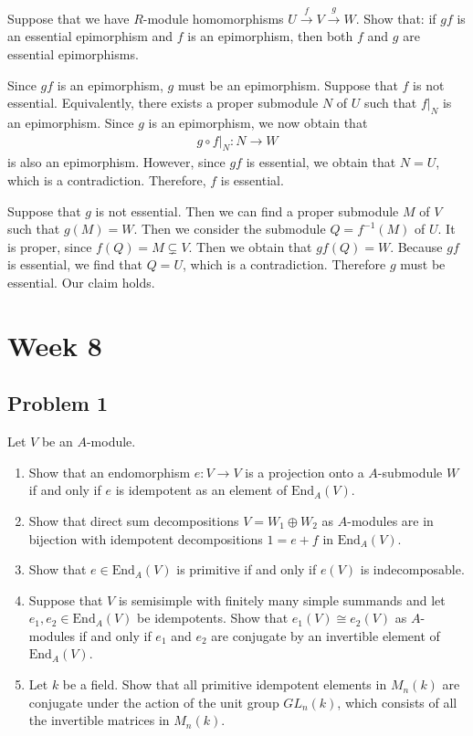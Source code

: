 Suppose that we have $R$-module homomorphisms $U \xrightarrow{f} V \xrightarrow{g} W$. Show that: if $gf$ is an essential epimorphism and $f$ is an epimorphism, then both $f$ and $g$ are essential epimorphisms.
\begin{solution}
    Since $gf$ is an epimorphism, $g$ must be an epimorphism. Suppose that $f$ is not essential. Equivalently, there exists a proper submodule $N$ of $U$ such that $f|_{N}$ is an epimorphism. Since $g$ is an epimorphism, we now obtain that 
    \begin{align*}
        g \circ f|_N: N\to W 
    \end{align*}  
    is also an epimorphism. However, since $gf$ is essential, we obtain that $N=U$, which is a contradiction.
    Therefore, $f$ is essential. 

    Suppose that $g$ is not essential. Then we can find a proper submodule $M$ of $V$ such that $g(M)=W$.
    Then we consider the submodule $Q = f^{-1}(M)$ of $U$. It is proper, since $f(Q)=M\subsetneq V$. 
    Then we obtain that $gf(Q)=W$. Because $gf$ is essential, we find that $Q=U$, which is a contradiction. Therefore $g$ must be essential.
    Our claim holds.
\end{solution}

\section{Week 8}
\subsection*{Problem 1}
Let $V$ be an $A$-module.
\begin{enumerate}
    \item[(a)] Show that an endomorphism $e : V \to V$ is a projection onto a $A$-submodule $W$ if and only if $e$ is idempotent as an element of $\text{End}_A(V)$.
    \item[(b)] Show that direct sum decompositions $V = W_1 \oplus W_2$ as $A$-modules are in bijection with idempotent decompositions $1 = e + f$ in $\text{End}_A(V)$.
    \item[(c)] Show that $e \in \text{End}_A(V)$ is primitive if and only if $e(V)$ is indecomposable.
    \item[(d)] Suppose that $V$ is semisimple with finitely many simple summands and let $e_1, e_2 \in \text{End}_A(V)$ be idempotents. Show that $e_1(V) \cong e_2(V)$ as $A$-modules if and only if $e_1$ and $e_2$ are conjugate by an invertible element of $\text{End}_A(V)$.
    \item[(e)] Let $k$ be a field. Show that all primitive idempotent elements in $M_n(k)$ are conjugate under the action of the unit group $GL_n(k)$, which consists of all the invertible matrices in $M_n(k)$.
\end{enumerate}

